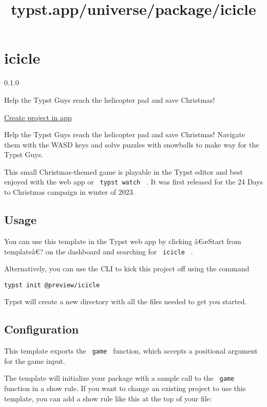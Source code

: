 \title{typst.app/universe/package/icicle}

\label{banner}
\label{template-thumbnail}

\section{icicle}\label{icicle}

{ 0.1.0 }

Help the Typst Guys reach the helicopter pad and save Christmas!

\href{/app?template=icicle&version=0.1.0}{Create project in app}

\label{readme}
Help the Typst Guys reach the helicopter pad and save Christmas!
Navigate them with the WASD keys and solve puzzles with snowballs to
make way for the Typst Guys.

This small Christmas-themed game is playable in the Typst editor and
best enjoyed with the web app or \texttt{\ typst\ watch\ } . It was
first released for the 24 Days to Christmas campaign in winter of 2023.

\subsection{Usage}\label{usage}

You can use this template in the Typst web app by clicking â€œStart from
templateâ€? on the dashboard and searching for \texttt{\ icicle\ } .

Alternatively, you can use the CLI to kick this project off using the
command

\begin{verbatim}
typst init @preview/icicle
\end{verbatim}

Typst will create a new directory with all the files needed to get you
started.

\subsection{Configuration}\label{configuration}

This template exports the \texttt{\ game\ } function, which accepts a
positional argument for the game input.

The template will initialize your package with a sample call to the
\texttt{\ game\ } function in a show rule. If you want to change an
existing project to use this template, you can add a show rule like this
at the top of your file:

